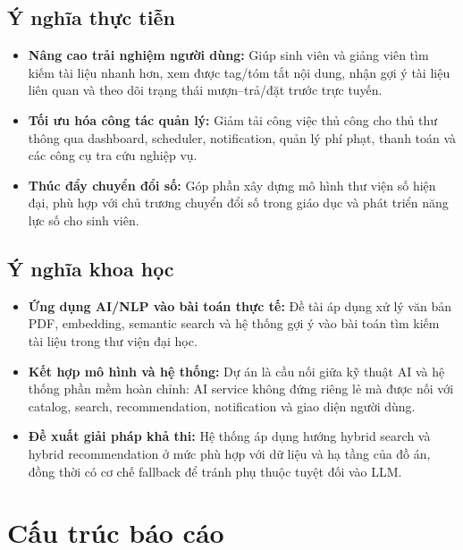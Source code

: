 \subsection{Ý nghĩa thực tiễn}
\label{subsec:YNghiaThucTien}
\begin{itemize}
    \item \textbf{Nâng cao trải nghiệm người dùng:} Giúp sinh viên và giảng viên
    tìm kiếm tài liệu nhanh hơn, xem được tag/tóm tắt nội dung, nhận gợi ý tài
    liệu liên quan và theo dõi trạng thái mượn--trả/đặt trước trực tuyến.
    \item \textbf{Tối ưu hóa công tác quản lý:} Giảm tải công việc thủ công cho
    thủ thư thông qua dashboard, scheduler, notification, quản lý phí phạt,
    thanh toán và các công cụ tra cứu nghiệp vụ.
    \item \textbf{Thúc đẩy chuyển đổi số:} Góp phần xây dựng mô hình thư viện số
    hiện đại, phù hợp với chủ trương chuyển đổi số trong giáo dục và phát triển
    năng lực số cho sinh viên.
\end{itemize}

\subsection{Ý nghĩa khoa học}
\label{subsec:YNghiaKhoaHoc}
\begin{itemize}
    \item \textbf{Ứng dụng AI/NLP vào bài toán thực tế:} Đề tài áp dụng xử lý
    văn bản PDF, embedding, semantic search và hệ thống gợi ý vào bài toán tìm
    kiếm tài liệu trong thư viện đại học.
    \item \textbf{Kết hợp mô hình và hệ thống:} Dự án là cầu nối giữa kỹ thuật
    AI và hệ thống phần mềm hoàn chỉnh: AI service không đứng riêng lẻ mà được
    nối với catalog, search, recommendation, notification và giao diện người
    dùng.
    \item \textbf{Đề xuất giải pháp khả thi:} Hệ thống áp dụng hướng hybrid
    search và hybrid recommendation ở mức phù hợp với dữ liệu và hạ tầng của đồ
    án, đồng thời có cơ chế fallback để tránh phụ thuộc tuyệt đối vào LLM.
\end{itemize}

\section{Cấu trúc báo cáo}
\label{sec:CauTruc}

